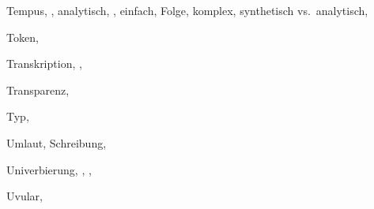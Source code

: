 \begin{theindex}
  \indexspace

  \item Tempus, , 
    \subitem analytisch, , 
    \subitem einfach, 
    \subitem Folge, 
    \subitem komplex, 
    \subitem synthetisch vs.\ analytisch, 
  \item Token, 
  \item Transkription, , 
  \item Transparenz, 
  \item Typ, 

\newpage
  \item Umlaut, 
    \subitem Schreibung, 
  \item Univerbierung, , , 
  \item Uvular, 

  \indexspace


\end{theindex}
